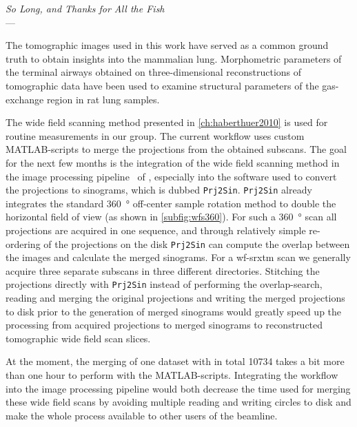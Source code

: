 \acresetall
{}\label{ch:outlook}
\begin{flushright}{\slshape    
		So Long, and Thanks for All the Fish} \\ \medskip
    ---  \citep{Adams1984}
\end{flushright}

\vfill

The tomographic images used in this work have served as a common ground truth to obtain insights into the mammalian lung. Morphometric parameters of the terminal airways obtained on three-dimensional reconstructions of tomographic data have been used to examine structural parameters of the gas-exchange region in rat lung samples.

The wide field scanning method presented in \autoref{ch:haberthuer2010} is used for routine measurements in our group. The current workflow uses custom MATLAB-scripts to merge the projections from the obtained subscans. The goal for the next few months is the integration of the wide field scanning method in the image processing pipeline~\cite{Hintermueller2010} of , especially into the software used to convert the projections to sinograms, which is dubbed \texttt{Prj2Sin}. \texttt{Prj2Sin} already integrates the standard \SI{360}{\degree} off-center sample rotation method to double the horizontal field of view (as shown in \autoref{subfig:wfs360}). For such a \SI{360}{\degree} scan all projections are acquired in one sequence, and through relatively simple re-ordering of the projections on the disk \texttt{Prj2Sin} can compute the overlap between the images and calculate the merged sinograms. For a \ac{wf-srxtm} scan we generally acquire three separate subscans in three different directories. Stitching the projections directly with \texttt{Prj2Sin} instead of performing the overlap-search, reading and merging the original projections and writing the merged projections to disk prior to the generation of merged sinograms would greatly speed up the processing from acquired projections to merged sinograms to reconstructed tomographic wide field scan slices.

At the moment, the merging of one dataset with in total \num{10734} takes a bit more than one hour to perform with the MATLAB-scripts. Integrating the workflow into the image processing pipeline would both decrease the time used for merging these wide field scans by avoiding multiple reading and writing circles to disk and make the whole process available to other users of the beamline.

